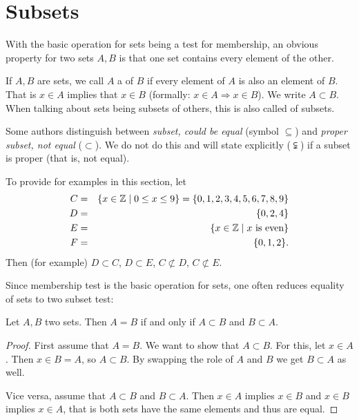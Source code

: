 \section{Subsets}
\label{secsubsets}

With the basic operation for sets being a test for membership, an obvious
property for two sets $A,B$ is that one set contains every element of the
other.

\begin{defn}
If $A,B$ are sets, we call $A$ a  of $B$ if every element of
$A$ is also an element of $B$. That is $x\in A$ implies that $x\in B$
(formally: $x\in A\Rightarrow x\in B$). We write $A\subset B$.
When talking about sets being subsets of others, this is also called
 of subsets.
\end{defn}
\begin{note}
Some authors distinguish between {\em subset, could be equal} (symbol
$\subseteq$) and {\em proper subset, not equal} ($\subset$). We do not do
this and will state explicitly ($\subsetneqq$) if a subset is 
proper (that is, not equal).
\end{note}

To provide for examples in this section, let 
\begin{eqnarray*}
C&=&\{x\in{\mathbb Z}\mid 0\le x\le9\}=\{0,1,2,3,4,5,6,7,8,9\}\\
D&=&\{0,2,4\}\\
E&=&\{x\in{\mathbb Z}\mid \mbox{$x$ is even}\}\\
F&=&\{0,1,2\}.\\
\end{eqnarray*}
Then (for example) $D\subset C$, $D\subset E$, $C\not\subset D$,
$C\not\subset E$.

Since membership test is the basic operation for sets, one often reduces
equality of sets to two subset test:
\begin{lemma}
\label{lemseteq}
Let $A,B$ two sets. Then $A=B$ if and only if $A\subset B$ and $B\subset A$.
\end{lemma}
\begin{proof}
First assume that $A=B$. We want to show that $A\subset B$. For this, let
$x\in A$. Then $x\in B=A$, so $A\subset B$. By swapping the role of $A$ and
$B$ we get $B\subset A$ as well.

Vice versa, assume that $A\subset B$ and $B\subset A$. Then $x\in A$ implies
$x\in B$ and $x\in B$ implies $x\in A$, that is both sets have the same
elements and thus are equal.
\end{proof}

